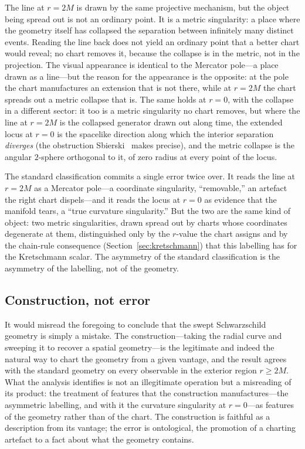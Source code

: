 \documentclass[11pt,a4paper]{article}
\theoremstyle{definition}
\begin{document}
The line at $r=2M$ is drawn by the same projective mechanism, but the object being spread out is not an ordinary point. It is a metric singularity: a place where the geometry itself has collapsed the separation between infinitely many distinct events. Reading the line back does not yield an ordinary point that a better chart would reveal; no chart removes it, because the collapse is in the metric, not in the projection. The visual appearance is identical to the Mercator pole---a place drawn as a line---but the reason for the appearance is the opposite: at the pole the chart manufactures an extension that is not there, while at $r=2M$ the chart spreads out a metric collapse that is. The same holds at $r=0$, with the collapse in a different sector: it too is a metric singularity no chart removes, but where the line at $r=2M$ is the collapsed generator drawn out along time, the extended locus at $r=0$ is the spacelike direction along which the interior separation \emph{diverges} (the obstruction Sbierski~\cite{sbierski2018} makes precise), and the metric collapse is the angular $2$-sphere orthogonal to it, of zero radius at every point of the locus.

The standard classification commits a single error twice over. It reads the line at $r=2M$ as a Mercator pole---a coordinate singularity, ``removable,'' an artefact the right chart dispels---and it reads the locus at $r=0$ as evidence that the manifold tears, a ``true curvature singularity.'' But the two are the same kind of object: two metric singularities, drawn spread out by charts whose coordinates degenerate at them, distinguished only by the $r$-value the chart assigns and by the chain-rule consequence (Section~\ref{sec:kretschmann}) that this labelling has for the Kretschmann scalar. The asymmetry of the standard classification is the asymmetry of the labelling, not of the geometry.

\subsection{Construction, not error}

It would misread the foregoing to conclude that the swept Schwarzschild geometry is simply a mistake. The construction---taking the radial curve and sweeping it to recover a spatial geometry---is the legitimate and indeed the natural way to chart the geometry from a given vantage, and the result agrees with the standard geometry on every observable in the exterior region $r \geq 2M$. What the analysis identifies is not an illegitimate operation but a misreading of its product: the treatment of features that the construction manufactures---the asymmetric labelling, and with it the curvature singularity at $r=0$---as features of the geometry rather than of the chart. The construction is faithful as a description from its vantage; the error is ontological, the promotion of a charting artefact to a fact about what the geometry contains.
\end{document}
